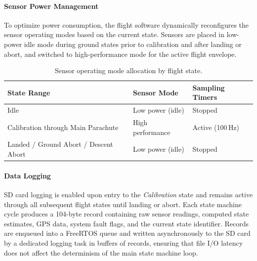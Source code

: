 \paragraph{Sensor Power Management}

To optimize power consumption, the flight software dynamically reconfigures the sensor operating modes based on the current state. Sensors are placed in low-power idle mode during ground states prior to calibration and after landing or abort, and switched to high-performance mode for the active flight envelope.

\begin{table}[H]
\centering
\caption{Sensor operating mode allocation by flight state.}
\label{tab:sensor_modes}
\begin{tabularx}{\textwidth}{l l X}
\toprule
\textbf{State Range} & \textbf{Sensor Mode} & \textbf{Sampling Timers} \\
\midrule
Idle & Low power (idle) & Stopped \\
Calibration through Main Parachute & High performance & Active (100\,Hz) \\
Landed / Ground Abort / Descent Abort & Low power (idle) & Stopped \\
\bottomrule
\end{tabularx}
\end{table}

\paragraph{Data Logging}

SD card logging is enabled upon entry to the \emph{Calibration} state and remains active through all subsequent flight states until landing or abort. Each state machine cycle produces a 104-byte record containing raw sensor readings, computed state estimates, GPS data, system fault flags, and the current state identifier. Records are enqueued into a FreeRTOS queue and written asynchronously to the SD card by a dedicated logging task in buffers of  records, ensuring that file I/O latency does not affect the determinism of the main state machine loop.
